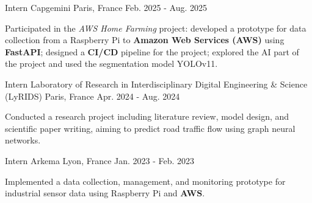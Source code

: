 

\begin{cventries}

    \cventry
    {Intern} %
    {Capgemini} %
    {Paris, France} %
    {Feb. 2025 - Aug. 2025} %
    {
        \begin{cvitems} %
            Participated in the \textit{AWS Home Farming} project:
            developed a prototype for data collection from a Raspberry Pi to
            \textbf{Amazon Web Services (AWS)} using \textbf{FastAPI};
            designed a \textbf{CI/CD} pipeline for the project;
            explored the AI part of the project and used the segmentation model YOLOv11.
        \end{cvitems}
    }

    \cventry
    {Intern} %
    {Laboratory of Research in Interdisciplinary Digital Engineering \& Science (LyRIDS)} %
    {Paris, France} %
    {Apr. 2024 - Aug. 2024} %
    {
        \begin{cvitems} %
            Conducted a research project including literature review, model design, and scientific paper writing, aiming
            to predict road traffic flow using graph neural networks.
        \end{cvitems}
    }

    \cventry
    {Intern} %
    {Arkema} %
    {Lyon, France} %
    {Jan. 2023 - Feb. 2023} %
    {
        \begin{cvitems} %
            Implemented a data collection, management, and monitoring prototype for industrial sensor data using Raspberry
            Pi and \textbf{AWS}.
        \end{cvitems}
    }

\end{cventries}
